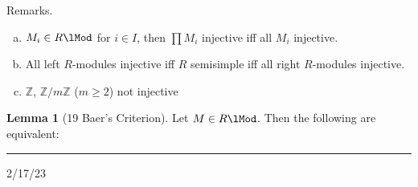 \documentclass[12pt]{article}
\newcommand{\sepline}{\rule{\textwidth}{0.4pt}}
\newenvironment{cd}{\begin{center}\begin{tikzcd}}{\end{tikzcd}\end{center}}
\theoremstyle{definition}
\newtheorem{lemma}{Lemma}
\newcommand{\Z}{\mathbb{Z}}
\renewcommand{\phi}{\varphi}
\newcommand{\<}{\left\langle}
\renewcommand{\>}{\right\rangle}
\newcommand{\teq}{\trianglelefteq}
\renewcommand{\_}[1]{{_{#1}}}
\begin{document}
Remarks.
\begin{enumerate}[(a)]
    \item $M_i \in R\lMod$ for $i \in I$, then $\prod M_i$ injective iff all $M_i$ injective.
    \item All left $R$-modules injective iff $R$ semisimple iff all right $R$-modules injective.
    \item $\Z$, $\Z/m\Z$ ($m \geq 2$) not injective
\end{enumerate}

\begin{lemma}[19 Baer's Criterion]
    Let $M \in R\lMod$.
    Then the following are equivalent:
\end{lemma}

\sepline

2/17/23
\end{document}
